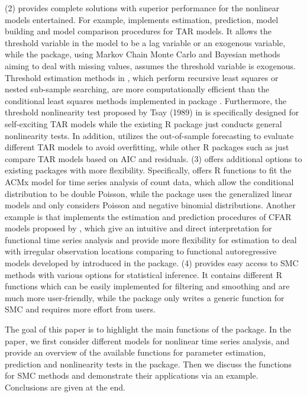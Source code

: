 (2)  provides complete solutions with superior performance for the nonlinear models entertained. For example,  implements estimation, prediction, model building and model comparison procedures for TAR models. It allows the threshold variable in the model to be a lag variable or an exogenous variable, while the  package, using Markov Chain Monte Carlo and Bayesian methods aiming to deal with missing values, assumes the threshold variable is exogenous. Threshold estimation methods in , which perform recursive least squares or nested sub-sample searching, are more computationally efficient than the conditional least squares methods implemented in package . Furthermore, the threshold nonlinearity test proposed by Tsay (1989) in  is specifically designed for self-exciting TAR models while the existing R package  just conducts general nonlinearity tests. In addition,  utilizes the out-of-sample forecasting to evaluate different TAR models to avoid overfitting, while other R packages such as  just compare TAR models based on AIC and residuals. (3)  offers additional options to existing packages with more flexibility. Specifically,  offers R functions to fit the ACMx model for time series analysis of count data, which allow the conditional distribution to be double Poisson, while the  package uses the generalized linear models and only considers Poisson and negative binomial distributions. Another example is that  implements the estimation and prediction procedures of CFAR models proposed by \cite{liu2016functional}, which give an intuitive and direct interpretation for functional time series analysis and provide more flexibility for estimation to deal with irregular observation locations comparing to functional autoregressive models developed by \cite{bosq2000} introduced in the  package. (4)  provides easy access to SMC methods with various options for statistical inference. It contains different R functions which can be easily implemented for filtering and smoothing and are much more user-friendly, while the  package only writes a generic function for SMC and requires more effort from users.

The goal of this paper is to highlight the main functions of the  package. In the paper, we first consider different models for nonlinear time series analysis, and provide an overview of the available functions for parameter estimation, prediction and nonlinearity tests in the  package. Then we discuss the functions for SMC methods and demonstrate their applications via an example. Conclusions are given at the end. 



